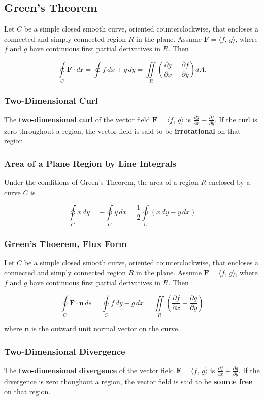 \subsection{Green's Theorem}
Let $C$ be a simple closed smooth curve, oriented counterclockwise, that encloses a connected and simply connected region $R$ in the plane. Assume $\mathbf{F} = \langle f,\, g \rangle$, where $f$ and $g$ have continuous first partial derivatives in $R$. Then

\begin{equation}
    \oint \limits _C \mathbf{F} \cdot d\mathbf{r} = \oint f \, dx + g \, dy = \iint \limits _R \left( \frac{\partial g}{\partial x} - \frac{\partial f}{\partial y} \right) dA.
\end{equation}

\subsubsection{Two-Dimensional Curl}
The \textbf{two-dimensional curl} of the vector field $\mathbf{F} = \langle f,\, g \rangle$ is $\frac{\partial g}{\partial x} - \frac{\partial f}{\partial y}$. If the curl is zero throughout a region, the vector field is said to be \textbf{irrotational} on that region.

\subsubsection{Area of a Plane Region by Line Integrals}
Under the conditions of Green's Theorem, the area of a region $R$ enclosed by a curve $C$ is

\begin{equation}
    \oint \limits _C x \, dy = - \oint \limits _C y \, dx = \frac{1}{2} \oint \limits _C (x \, dy - y \, dx)
\end{equation}

\subsubsection{Green's Thoerem, Flux Form}
Let $C$ be a simple closed smooth curve, oriented counterclockwise, that encloses a connected and simply connected region $R$ in the plane. Assume $\mathbf{F} = \langle f,\, g \rangle$, where $f$ and $g$ have continuous first partial derivatives in $R$. Then

\begin{equation}
    \oint \limits _C \mathbf{F \cdot n} \, ds = \oint \limits _C f \, dy - g \, dx = \iint \limits _R \left( \frac{\partial f}{\partial x} + \frac{\partial g}{\partial y} \right)
\end{equation}

where $\mathbf{n}$ is the outward unit normal vector on the curve.

\subsubsection{Two-Dimensional Divergence}
The \textbf{two-dimensional divergence} of the vector field $\mathbf{F} = \langle f,\, g \rangle$ is $\frac{\partial f}{\partial x} + \frac{\partial g}{\partial y}$. If the divergence is zero thoughout a region, the vector field is said to be \textbf{source free} on that region.
